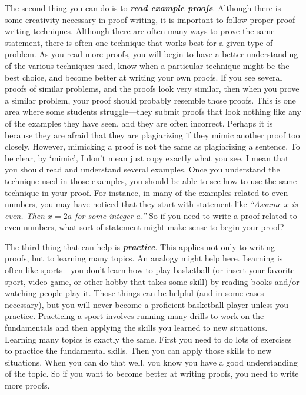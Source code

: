 The second thing you can do is to {\bf\em read example proofs}.  
Although there is some creativity necessary in proof writing, 
it is important to follow proper proof writing techniques.  
Although there are often many ways to prove the same statement, 
there is often one technique that works best for a given type of problem. 
As you read more proofs, you will begin to have a better understanding of the various techniques used,
know when a particular technique might be the best choice, 
and become better at writing your own proofs.  If you see several proofs of similar problems,
and the proofs look very similar, then when you prove a similar problem, your proof should probably resemble
those proofs.  This is one area where some students struggle---they submit proofs that look
nothing like any of the examples they have seen, and they are often incorrect.  
Perhaps it is because they are afraid
that they are plagiarizing if they mimic another proof too closely.  However, mimicking a proof is not the
same as plagiarizing a sentence.  To be clear, by `mimic', I don't mean just copy exactly what you see.  I mean
that you should read and understand several examples.  Once you understand the technique used in those examples,
you should be able to see how to use the same technique in your proof.  For instance, in many of the examples
related to even numbers, you may have noticed that they start with statement like {\em ``Assume $x$ is even.  Then
$x=2a$ for some integer $a$.''}  So if you need to write a proof related to even numbers, what sort of 
statement might make sense to begin your proof?

The third thing that can help is {\bf\em practice}.  This applies not only to writing proofs, but to learning
many topics.
An analogy might help here. Learning is often like sports---you don't learn how to play basketball 
(or insert your favorite sport, video game, or other hobby that takes some skill) 
by reading books and/or watching people play it. 
Those things can be helpful (and in some cases necessary), 
but you will never become a proficient basketball player unless you practice. 
Practicing a sport involves running many drills to work on the fundamentals and then applying the 
skills you learned to new situations. Learning many topics is exactly the same.  First you need to 
do lots of exercises to practice the fundamental skills. Then you can apply those skills to new situations. 
When you can do that well, you know you have a good understanding of the topic.  So if you want to become
better at writing proofs, you need to write more proofs.

